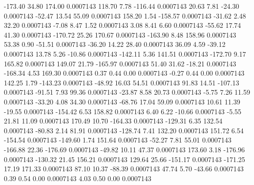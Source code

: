      -173.40       34.80      174.00     0.0007143
      118.70        7.78     -116.44     0.0007143
       20.63        7.81      -24.30     0.0007143
      -52.47       13.54       55.09     0.0007143
      158.20        1.54     -158.57     0.0007143
      -31.62        2.48       32.20     0.0007143
       -7.08        8.47        1.52     0.0007143
        3.08        8.41        6.60     0.0007143
      -55.62       17.74       41.30     0.0007143
     -170.72       25.26      170.67     0.0007143
     -163.90        8.48      158.96     0.0007143
       53.38        0.90      -51.51     0.0007143
      -36.20       14.22       28.40     0.0007143
       36.09        4.59      -39.12     0.0007143
       13.78        5.26      -10.86     0.0007143
     -142.11        5.36      141.51     0.0007143
     -172.70        9.17      165.82     0.0007143
      149.07       21.79     -165.97     0.0007143
       51.40       31.62      -18.21     0.0007143
     -168.34        4.53      169.30     0.0007143
        0.37        0.44        0.00     0.0007143
       -0.27        0.44        0.00     0.0007143
      142.25        1.79     -143.23     0.0007143
      -48.92       16.03       54.51     0.0007143
       91.83       14.51     -107.13     0.0007143
      -91.51        7.93       99.36     0.0007143
      -23.87        8.58       20.73     0.0007143
       -5.75        7.26       11.59     0.0007143
      -33.20        4.08       34.30     0.0007143
      -68.76       17.04       59.09     0.0007143
       10.61       11.39      -19.55     0.0007143
     -154.42        6.53      158.82     0.0007143
        6.40        6.22      -10.66     0.0007143
       -5.55       21.81       11.09     0.0007143
      170.49       10.70     -164.33     0.0007143
     -129.31        6.35      132.54     0.0007143
      -80.83        2.14       81.91     0.0007143
     -128.74        7.41      132.20     0.0007143
      151.72        6.54     -154.54     0.0007143
     -149.60        1.74      151.64     0.0007143
      -52.27        7.81       55.01     0.0007143
     -166.88       22.36     -176.69     0.0007143
      -49.82       10.11       47.37     0.0007143
      173.60        3.18     -176.96     0.0007143
     -130.32       21.45      156.21     0.0007143
      129.64       25.66     -151.17     0.0007143
     -171.25       17.19      171.33     0.0007143
       87.10       10.37      -88.39     0.0007143
       47.74        5.70      -43.66     0.0007143
        0.39        0.54        0.00     0.0007143
        4.03        0.50        0.00     0.0007143
